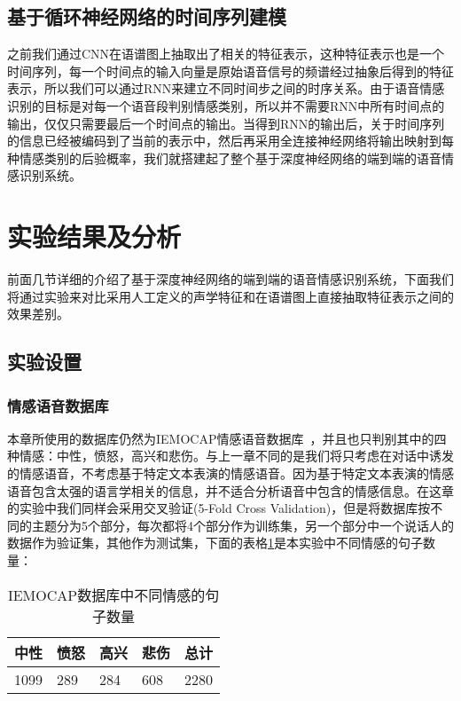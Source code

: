 \subsection{基于循环神经网络的时间序列建模}
\label{ssec:rnn_seq_model_detail}

之前我们通过CNN在语谱图上抽取出了相关的特征表示，这种特征表示也是一个时间序列，每一个时间点的输入向量是原始语音信号的频谱经过抽象后得到的特征表示，所以我们可以通过RNN来建立不同时间步之间的时序关系。由于语音情感识别的目标是对每一个语音段判别情感类别，所以并不需要RNN中所有时间点的输出，仅仅只需要最后一个时间点的输出。当得到RNN的输出后，关于时间序列的信息已经被编码到了当前的表示中，然后再采用全连接神经网络将输出映射到每种情感类别的后验概率，我们就搭建起了整个基于深度神经网络的端到端的语音情感识别系统。


\section{实验结果及分析}
\label{sec:end2end_experiment}

前面几节详细的介绍了基于深度神经网络的端到端的语音情感识别系统，下面我们将通过实验来对比采用人工定义的声学特征和在语谱图上直接抽取特征表示之间的效果差别。

\subsection{实验设置}
\label{ssec:end2end_experiment_setup}

\subsubsection{情感语音数据库}
\label{ssec:end2end_database}

本章所使用的数据库仍然为IEMOCAP情感语音数据库~\cite{Busso2008IEMOCAP}，并且也只判别其中的四种情感：中性，愤怒，高兴和悲伤。与上一章不同的是我们将只考虑在对话中诱发的情感语音，不考虑基于特定文本表演的情感语音。因为基于特定文本表演的情感语音包含太强的语言学相关的信息，并不适合分析语音中包含的情感信息。在这章的实验中我们同样会采用交叉验证(5-Fold Cross Validation)，但是将数据库按不同的主题分为5个部分，每次都将4个部分作为训练集，另一个部分中一个说话人的数据作为验证集，其他作为测试集，下面的表格\ref{tab:end2end_emo_sample_num}是本实验中不同情感的句子数量：

\begin{table}[htb]
\centering
\begin{minipage}[t]{0.8\linewidth} %
\caption{IEMOCAP数据库中不同情感的句子数量}
\label{tab:end2end_emo_sample_num}
    \begin{tabularx}{\linewidth}{X<{\centering} X<{\centering} X<{\centering} X<{\centering} X<{\centering}}
        \toprule[1.5pt]
        中性 & 愤怒 & 高兴 & 悲伤 & 总计 \\
        \midrule[1pt]
        1099 & 289 & 284 & 608 & 2280 \\
        \bottomrule[1.5pt]
    \end{tabularx}
\end{minipage}
\end{table}


